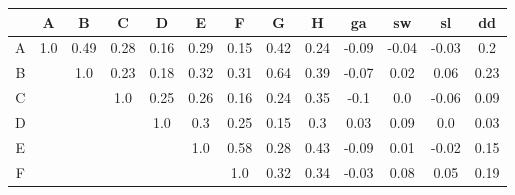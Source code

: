 
\begin{table}[h]
\centering
\begin{tabular}{ccccccccccccc}

& A & B & C & D & E & F & G & H & ga & sw & sl & dd\\ \hline
A & \textcolor{cor-very-strong}{1.0} & \textcolor{cor-moderate}{0.49} & \textcolor{cor-weak}{0.28} & \textcolor{cor-very-weak}{0.16} & \textcolor{cor-weak}{0.29} & \textcolor{cor-very-weak}{0.15} & \textcolor{cor-moderate}{0.42} & \textcolor{cor-weak}{0.24} & \textcolor{cor-very-weak}{-0.09} & \textcolor{cor-very-weak}{-0.04} & \textcolor{cor-very-weak}{-0.03} & \textcolor{cor-weak}{0.2}\\ \hline
B &  & \textcolor{cor-very-strong}{1.0} & \textcolor{cor-weak}{0.23} & \textcolor{cor-very-weak}{0.18} & \textcolor{cor-weak}{0.32} & \textcolor{cor-weak}{0.31} & \textcolor{cor-strong}{0.64} & \textcolor{cor-weak}{0.39} & \textcolor{cor-very-weak}{-0.07} & \textcolor{cor-very-weak}{0.02} & \textcolor{cor-very-weak}{0.06} & \textcolor{cor-weak}{0.23}\\ \hline
C &  &  & \textcolor{cor-very-strong}{1.0} & \textcolor{cor-weak}{0.25} & \textcolor{cor-weak}{0.26} & \textcolor{cor-very-weak}{0.16} & \textcolor{cor-weak}{0.24} & \textcolor{cor-weak}{0.35} & \textcolor{cor-very-weak}{-0.1} & \textcolor{cor-very-weak}{0.0} & \textcolor{cor-very-weak}{-0.06} & \textcolor{cor-very-weak}{0.09}\\ \hline
D &  &  &  & \textcolor{cor-very-strong}{1.0} & \textcolor{cor-weak}{0.3} & \textcolor{cor-weak}{0.25} & \textcolor{cor-very-weak}{0.15} & \textcolor{cor-weak}{0.3} & \textcolor{cor-very-weak}{0.03} & \textcolor{cor-very-weak}{0.09} & \textcolor{cor-very-weak}{0.0} & \textcolor{cor-very-weak}{0.03}\\ \hline
E &  &  &  &  & \textcolor{cor-very-strong}{1.0} & \textcolor{cor-moderate}{0.58} & \textcolor{cor-weak}{0.28} & \textcolor{cor-moderate}{0.43} & \textcolor{cor-very-weak}{-0.09} & \textcolor{cor-very-weak}{0.01} & \textcolor{cor-very-weak}{-0.02} & \textcolor{cor-very-weak}{0.15}\\ \hline
F &  &  &  &  &  & \textcolor{cor-very-strong}{1.0} & \textcolor{cor-weak}{0.32} & \textcolor{cor-weak}{0.34} & \textcolor{cor-very-weak}{-0.03} & \textcolor{cor-very-weak}{0.08} & \textcolor{cor-very-weak}{0.05} & \textcolor{cor-very-weak}{0.19}\\ \hline

\end{tabular}
\end{table}
